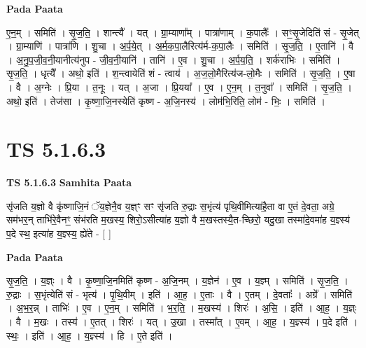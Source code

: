 \documentclass[17pt]{extarticle}
\begin{document}
\textbf{Pada Paata} \newline

ए॒न॒म् । समिति॑ । सृ॒ज॒ति॒ । शान्त्यै᳚ । यत् । ग्रा॒म्याणा᳚म् । पात्रा॑णाम् । क॒पालैः᳚ । सꣳ॒॒सृ॒जेदिति॑ सं - सृ॒जेत् । ग्रा॒म्याणि॑ । पात्रा॑णि । शु॒चा । अ॒र्प॒ये॒त् । अ॒र्म॒क॒पा॒लैरित्य॑र्म-क॒पा॒लैः । समिति॑ । सृ॒ज॒ति॒ । ए॒तानि॑ । वै । अ॒नु॒प॒जी॒व॒नी॒यानीत्य॑नुप - जी॒व॒नी॒यानि॑ । तानि॑ । ए॒व । शु॒चा । अ॒र्प॒य॒ति॒ । शर्क॑राभिः । समिति॑ । सृ॒ज॒ति॒ । धृत्यै᳚ । अथो॒ इति॑ । श॒न्त्वायेति॑ शं - त्वाय॑ । अ॒ज॒लो॒मैरित्य॑ज-लो॒मैः । समिति॑ । सृ॒ज॒ति॒ । ए॒षा । वै । अ॒ग्नेः । प्रि॒या । त॒नूः । यत् । अ॒जा । प्रि॒यया᳚ । ए॒व । ए॒न॒म् । त॒नुवा᳚ । समिति॑ । सृ॒ज॒ति॒ । अथो॒ इति॑ । तेज॑सा । कृ॒ष्णा॒जि॒नस्येति॑ कृष्ण - अ॒जि॒नस्य॑ । लोम॑भि॒रिति॒ लोम॑ - भिः॒ । समिति॑ ।  \newline





\section{ TS 5.1.6.3 }

\textbf{TS 5.1.6.3 } \newline
\textbf{Samhita Paata} \newline

सृ॑जति य॒ज्ञो वै कृ॑ष्णाजि॒नं ॅय॒ज्ञेनै॒व य॒ज्ञ्ꣳ सꣳ सृ॑जति रु॒द्राः स॒भृंत्य॑ पृथि॒वीमित्या॑है॒ता वा ए॒तं दे॒वता॒ अग्रे॒ सम॑भर॒न् ताभि॑रे॒वैनꣳ॒॒ संभ॑रति म॒खस्य॒ शिरो॒ऽसीत्या॑ह य॒ज्ञो वै म॒खस्तस्यै॒त-च्छिरो॒ यदु॒खा तस्मा॑दे॒वमा॑ह य॒ज्ञ्स्य॑ प॒दे स्थ॒ इत्या॑ह य॒ज्ञ्स्य॒ ह्ये॑ते - [  ] \newline

\textbf{Pada Paata} \newline

सृ॒ज॒ति॒ । य॒ज्ञ्ः । वै । कृ॒ष्णा॒जि॒नमिति॑ कृष्ण - अ॒जि॒नम् । य॒ज्ञेन॑ । ए॒व । य॒ज्ञ्म् । समिति॑ । सृ॒ज॒ति॒ । रु॒द्राः । स॒भृंत्येति॑ सं - भृत्य॑ । पृ॒थि॒वीम् । इति॑ । आ॒ह॒ । ए॒ताः । वै । ए॒तम् । दे॒वताः᳚ । अग्रे᳚ । समिति॑ । अ॒भ॒र॒न्न् । ताभिः॑ । ए॒व । ए॒न॒म् । समिति॑ । भ॒र॒ति॒ । म॒खस्य॑ । शिरः॑ । अ॒सि॒ । इति॑ । आ॒ह॒ । य॒ज्ञ्ः । वै । म॒खः । तस्य॑ । ए॒तत् । शिरः॑ । यत् । उ॒खा । तस्मा᳚त् । ए॒वम् । आ॒ह॒ । य॒ज्ञ्स्य॑ । प॒दे इति॑ । स्थः॒ । इति॑ । आ॒ह॒ । य॒ज्ञ्स्य॑ । हि । ए॒ते इति॑ ।  \newline




\end{document}
